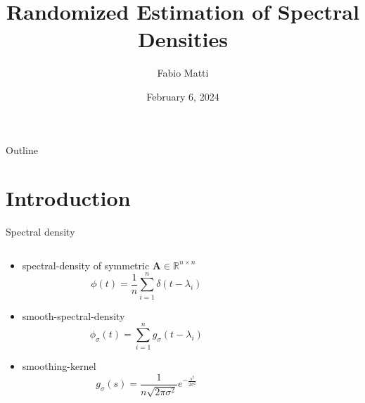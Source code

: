 \documentclass[aspectratio=169, 12pt]{beamer}
\title{Randomized Estimation of Spectral Densities}
\date{February 6, 2024}
\author{Fabio Matti}
\newcommand{\mtx}[1]{\boldsymbol{#1}}
\begin{document}
\begin{frame}[noframenumbering]

    \titlepage

\end{frame}

\begin{frame}{Outline}

    \tableofcontents

    \begin{centering}
        
    \end{centering}
\end{frame}

\section{Introduction}

\begin{frame}{Spectral density}
    \begin{columns}
        \begin{column}{0.7\textwidth}
            \begin{itemize}
                \item \Gls{spectral-density} of symmetric $\mtx{A} \in \mathbb{R}^{n \times n}$
                \begin{equation}
                    \phi(t) = \frac{1}{n} \sum_{i=1}^n \delta(t - \lambda_i)
                \end{equation}
                \item \Gls{smooth-spectral-density}
                \begin{equation}
                    \phi_{\sigma}(t) = \sum_{i=1}^n g_{\sigma}(t - \lambda_i)
                \end{equation}
                \item \Gls{smoothing-kernel}
                \begin{equation}
                    g_{\sigma}(s) = \frac{1}{n \sqrt{2 \pi \sigma^2}} e^{-\frac{s^2}{2\sigma^2}}
                \end{equation}
            \end{itemize}
        \end{column}
        \begin{column}{0.3\textwidth}
            \centering
        \end{column}
    \end{columns}
\end{frame}
\end{document}
